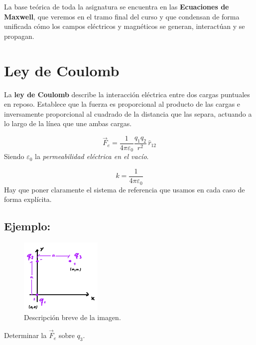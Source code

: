 \documentclass[a4paper,12pt]{article}
\begin{document}
\noindent
La base teórica de toda la asignatura se encuentra en las \textbf{Ecuaciones de Maxwell}, que veremos en el tramo final del curso y que condensan de forma unificada cómo los campos eléctricos y magnéticos se generan, interactúan y se propagan.

\newpage

\section{Ley de Coulomb}

\noindent
La \textbf{ley de Coulomb} describe la interacción eléctrica entre dos cargas puntuales en reposo. 
Establece que la fuerza es proporcional al producto de las cargas e inversamente proporcional al cuadrado de la distancia que las separa, 
actuando a lo largo de la línea que une ambas cargas.

\[
\vec{F}_e = \frac{1}{4\pi\varepsilon_0} \frac{q_1 q_2}{r^2} \, \hat{r}_{12}
\]
Siendo $\varepsilon_0$ la \textit{permeabilidad eléctrica en el vacío}.

\[
k = \frac{1}{4\pi\varepsilon_0}
\]
Hay que poner claramente el sistema de referencia que usamos en cada caso de forma explícita.  

\subsection*{Ejemplo:}
\begin{figure}[h]
  \centering
  \includegraphics[width=0.35\textwidth]{imagen_1.jpeg}
  \caption{Descripción breve de la imagen.}
  \label{fig:imagen1}
\end{figure}
\noindent
Determinar la $\vec{F}_e$ sobre $q_3$. 
\end{document}
